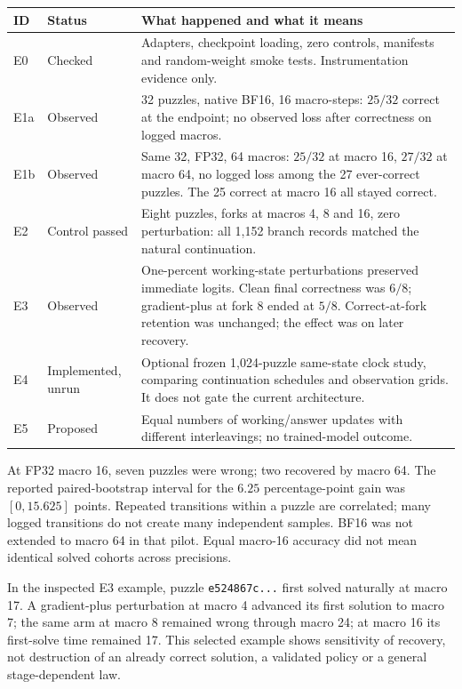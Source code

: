 \documentclass[11pt,a4paper]{article}
\newcommand{\code}[1]{\nolinkurl{#1}}
\begin{document}
\begin{longtable}{@{}P{13mm}P{25mm}P{116mm}@{}}\toprule
ID & Status & What happened and what it means\\\midrule\endhead
E0 & Checked & Adapters, checkpoint loading, zero controls, manifests and random-weight smoke tests. Instrumentation evidence only.\\
E1a & Observed & 32 puzzles, native BF16, 16 macro-steps: $25/32$ correct at the endpoint; no observed loss after correctness on logged macros.\\
E1b & Observed & Same 32, FP32, 64 macros: $25/32$ at macro 16, $27/32$ at macro 64, no logged loss among the 27 ever-correct puzzles. The 25 correct at macro 16 all stayed correct.\\
E2 & Control passed & Eight puzzles, forks at macros 4, 8 and 16, zero perturbation: all 1,152 branch records matched the natural continuation.\\
E3 & Observed & One-percent working-state perturbations preserved immediate logits. Clean final correctness was $6/8$; gradient-plus at fork 8 ended at $5/8$. Correct-at-fork retention was unchanged; the effect was on later recovery.\\
E4 & Implemented, unrun & Optional frozen 1,024-puzzle same-state clock study, comparing continuation schedules and observation grids. It does not gate the current architecture.\\
E5 & Proposed & Equal numbers of working/answer updates with different interleavings; no trained-model outcome.\\\bottomrule
\end{longtable}

At FP32 macro 16, seven puzzles were wrong; two recovered by macro 64. The reported paired-bootstrap interval for the $6.25$ percentage-point gain was $[0,15.625]$ points. Repeated transitions within a puzzle are correlated; many logged transitions do not create many independent samples. BF16 was not extended to macro 64 in that pilot. Equal macro-16 accuracy did not mean identical solved cohorts across precisions.

In the inspected E3 example, puzzle \code{e524867c...} first solved naturally at macro 17. A gradient-plus perturbation at macro 4 advanced its first solution to macro 7; the same arm at macro 8 remained wrong through macro 24; at macro 16 its first-solve time remained 17. This selected example shows sensitivity of recovery, not destruction of an already correct solution, a validated policy or a general stage-dependent law.
\end{document}
